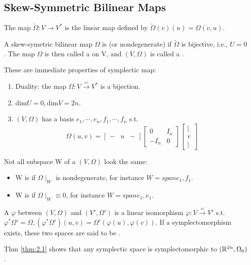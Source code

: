 \documentclass[4paper]{article}
\begin{document}
\subsection{Skew-Symmetric Bilinear Maps}
\begin{definition}
The map $\tilde{\Omega}:V\rightarrow V^*$ is the linear map defined by $\tilde{\Omega}(v)(u)=\Omega
(v,u)$.
\end{definition}
\begin{definition}
A skew-symetric bilinear map $\Omega$ is  (or nondegenerate) if $\tilde{\Omega}$ is 
bijective, i.e., $U={0}$. The map $\Omega$ is then called a  on V,
and $(V,\Omega)$ is called a .
\end{definition}
\begin{note} 
These are immediate properties of symplectic map:
\begin{enumerate}
\item Duality: the map $\Omega : V \overset{\backsimeq}{\rightarrow} V^*$ is a bijection.
\item $\text{dim}U=0,\text{dim}V=2n$.
\item $(V,\Omega)$ has a basis $e_1,\cdots,e_n,f_1,\cdots,f_n$ s.t.
\begin{equation*}
\Omega(u,v)=
\begin{bmatrix}
- & u & -
\end{bmatrix}
\begin{bmatrix}
0    & I_n \\
-I_n & 0
\end{bmatrix}
\begin{bmatrix}
| \\
v \\
|
\end{bmatrix}
\end{equation*}
\end{enumerate}
\end{note}
\begin{remark}
Not all subspace W of a $(V,\Omega)$ look the same:
\begin{itemize}
\item W is  if $\Omega\mid_W$ is nondegenerate, for instance $W=span{e_1,f_1}$.
\item W is  if $\Omega\mid_W\equiv0$, for instance $W=span{e_1,e_1}$.
\end{itemize}
\end{remark}
\begin{definition}
A  $\varphi$ between $(V,\Omega)$ and $(V',\Omega ')$ is a linear isomorphism
$\varphi:V\overset{\backsimeq}{\rightarrow} V'$ s.t. $\varphi^*\Omega '=\Omega, (\varphi^*
\Omega ')(u,v)=\Omega '(\varphi(u),\varphi(v))$. If a symplectomorphism exists, these two spaces are
said to be .
\end{definition}
\begin{remark}
Thm \ref{thm:2.1} shows that any symplectic space is symplectomorphic to $(\mathbb{R}^{2n},\Omega_0)$.
\end{remark}
\end{document}
